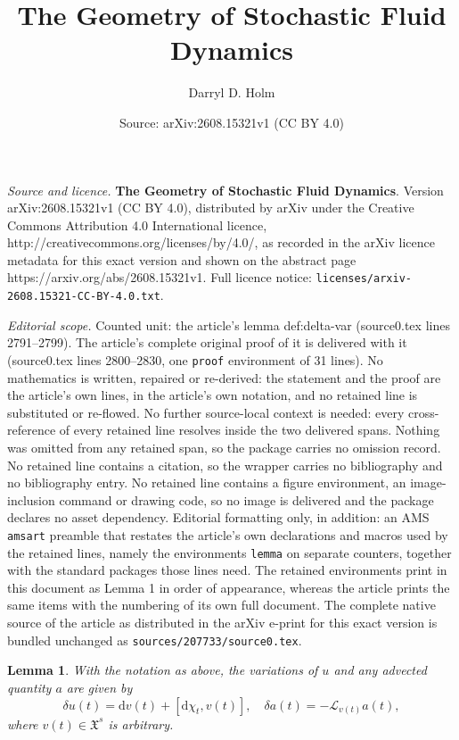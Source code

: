 \documentclass[10pt,a4paper]{amsart}
\title{\textbf{The Geometry of Stochastic Fluid Dynamics}}
\author{Darryl D. Holm}
\date{Source: arXiv:2608.15321v1 (CC BY 4.0)}
\newtheorem{lemma}{Lemma}
\def\rmd{{\mathrm{d}}}
\begin{document}
\maketitle

\noindent\emph{Source and licence.} \textbf{The Geometry of Stochastic Fluid Dynamics}. Version arXiv:2608.15321v1 (CC BY 4.0), distributed by arXiv under the Creative Commons Attribution 4.0 International licence, http://creativecommons.org/licenses/by/4.0/, as recorded in the arXiv licence metadata for this exact version and shown on the abstract page https://arxiv.org/abs/2608.15321v1. Full licence notice: \texttt{licenses/arxiv-2608.15321-CC-BY-4.0.txt}.\par\smallskip

\noindent\textit{Editorial scope.} Counted unit: the article's lemma def:delta-var (source0.tex lines 2791--2799). The article's complete original proof of it is delivered with it (source0.tex lines 2800--2830, one \texttt{proof} environment of 31 lines). No mathematics is written, repaired or re-derived: the statement and the proof are the article's own lines, in the article's own notation, and no retained line is substituted or re-flowed.  No further source-local context is needed: every cross-reference of every retained line resolves inside the two delivered spans.  Nothing was omitted from any retained span, so the package carries no omission record.  No retained line contains a citation, so the wrapper carries no bibliography and no bibliography entry.  No retained line contains a figure environment, an image-inclusion command or drawing code, so no image is delivered and the package declares no asset dependency.  Editorial formatting only, in addition: an AMS \texttt{amsart} preamble that restates the article's own declarations and macros used by the retained lines, namely the environments \texttt{lemma} on separate counters, together with the standard packages those lines need.  The retained environments print in this document as Lemma 1 in order of appearance, whereas the article prints the same items with the numbering of its own full document.  The complete native source of the article as distributed in the arXiv e-print for this exact version is bundled unchanged as \texttt{sources/207733/source0.tex}.
\begin{lemma}
With the notation as above, the variations of $u$ and any advected quantity $a$ are given by 
\begin{equation}
\delta u(t) = {\rmd}v(t) + [{\rmd}\chi_t,v(t)],\quad \delta a(t) = -\mathcal{L}_{v(t)}a(t),
\label{def:delta-var}
\end{equation}
where $v(t)\in\mathfrak{X}^s$ is arbitrary.
 
\end{lemma}
\end{document}
